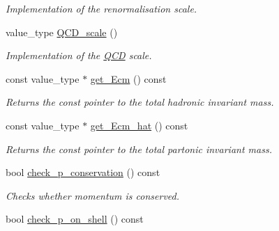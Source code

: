 \begin{DoxyCompactItemize}
\begin{DoxyCompactList}\small\item\em Implementation of the renormalisation scale. \end{DoxyCompactList}\item 
\hypertarget{a00441_ad952cbdc5f60eefb09b4630f89e42622}{value\-\_\-type \hyperlink{a00441_ad952cbdc5f60eefb09b4630f89e42622}{Q\-C\-D\-\_\-scale} ()}\label{a00441_ad952cbdc5f60eefb09b4630f89e42622}

\begin{DoxyCompactList}\small\item\em Implementation of the \hyperlink{a00449}{Q\-C\-D} scale. \end{DoxyCompactList}\item 
\hypertarget{a00441_af3ba9e129ae7001887ad013f2c615cd6}{const value\-\_\-type $\ast$ \hyperlink{a00441_af3ba9e129ae7001887ad013f2c615cd6}{get\-\_\-\-Ecm} () const }\label{a00441_af3ba9e129ae7001887ad013f2c615cd6}

\begin{DoxyCompactList}\small\item\em Returns the const pointer to the total hadronic invariant mass. \end{DoxyCompactList}\item 
\hypertarget{a00441_a98ef07838819ee024376ca18407c94e7}{const value\-\_\-type $\ast$ \hyperlink{a00441_a98ef07838819ee024376ca18407c94e7}{get\-\_\-\-Ecm\-\_\-hat} () const }\label{a00441_a98ef07838819ee024376ca18407c94e7}

\begin{DoxyCompactList}\small\item\em Returns the const pointer to the total partonic invariant mass. \end{DoxyCompactList}\item 
\hypertarget{a00441_ad9b77d74cfcac649bcfeb21e20cfd3a6}{bool \hyperlink{a00441_ad9b77d74cfcac649bcfeb21e20cfd3a6}{check\-\_\-p\-\_\-conservation} () const }\label{a00441_ad9b77d74cfcac649bcfeb21e20cfd3a6}

\begin{DoxyCompactList}\small\item\em Checks whether momentum is conserved. \end{DoxyCompactList}\item 
\hypertarget{a00441_a369ca024b5d8ca76944c637750fff5ee}{bool \hyperlink{a00441_a369ca024b5d8ca76944c637750fff5ee}{check\-\_\-p\-\_\-on\-\_\-shell} () const }\label{a00441_a369ca024b5d8ca76944c637750fff5ee}


\end{DoxyCompactItemize}
